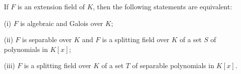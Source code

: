 If $F$ is an extension field of $K$, then the following statements are equivalent:

(i) $F$ is algebraic and Galois over $K$;

(ii) $F$ is separable over $K$ and $F$ is a splitting field over $K$ of a set $S$ of polynomials in $K[x]$;

(iii) $F$ is a splitting field over $K$ of a set $T$ of separable polynomials in $K[x]$.
